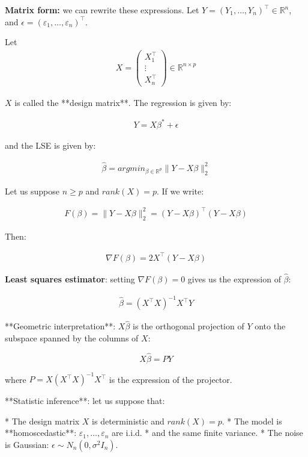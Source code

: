 \textbf{Matrix form:} we can rewrite these expressions. Let $Y = (Y_1, \ldots, Y_n)^\top \in \mathbb{R}^n$, and $\epsilon = (\varepsilon_1, \ldots, \varepsilon_n)^\top$. 

Let
\begin{align*}
X = \begin{pmatrix} X_1^\top \\ \vdots \\ X_n^\top \end{pmatrix} \in \mathbb{R}^{n \times p}
\end{align*}

$X$ is called the **design matrix**. The regression is given by:

\begin{align*}
Y = X\beta^{*} + \epsilon
\end{align*}

and the LSE is given by:

\begin{align*}
\hat{\beta} = argmin_{\beta \in \mathbb{R}^p} \|Y - X\beta\|^2_2
\end{align*}


Let us suppose $n \geq p$ and $rank(X) = p$. If we write:

\begin{align*}
F(\beta)  = \|Y - X\beta\|^2_2 = (Y - X\beta)^\top(Y - X\beta)
\end{align*}


Then:

\begin{align*}
\nabla F(\beta) = 2 X^\top(Y - X\beta)
\end{align*}


\textbf{Least squares estimator}: setting $\nabla F(\beta) = 0$ gives us the expression of $\hat{\beta}$:

\begin{align*}
\hat{\beta} = (X^\top X)^{-1}X^\top Y
\end{align*}


**Geometric interpretation**: $X\hat{\beta}$ is the orthogonal projection of $Y$ onto the subspace spanned by the columns of $X$:

$$ X\hat{\beta} = PY$$

where $P = X(X^\top X)^{-1}X^\top$ is the expression of the projector.

**Statistic inference**: let us suppose that:

* The design matrix $X$ is deterministic and $rank(X) = p$.
* The model is **homoscedastic**: $\varepsilon_1, \ldots, \varepsilon_n$ are i.i.d.
* and the same finite variance.
* The noise is Gaussian: $\epsilon \sim N_n(0, \sigma^2I_n)$.

